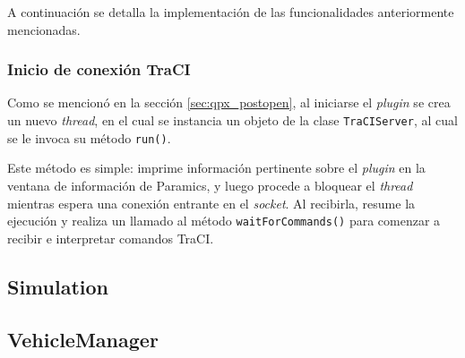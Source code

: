 A continuación se detalla la implementación de las funcionalidades anteriormente mencionadas.

\subsubsection{Inicio de conexión TraCI}

Como se mencionó en la sección \ref{sec:qpx_postopen}, al iniciarse el \emph{plugin} se crea un nuevo \emph{thread}, en el cual se instancia un objeto de la clase \texttt{TraCIServer}, al cual se le invoca su método \texttt{run()}.



Este método es simple: imprime información pertinente sobre el \emph{plugin} en la ventana de información de Paramics, y luego procede a bloquear el \emph{thread} mientras espera una conexión entrante en el \emph{socket}. Al recibirla, resume la ejecución y realiza un llamado al método \texttt{waitForCommands()} para comenzar a recibir e interpretar comandos TraCI.

\subsection{Simulation}\label{sec:simulation}
\subsection{VehicleManager}\label{sec:vehiclemanager}